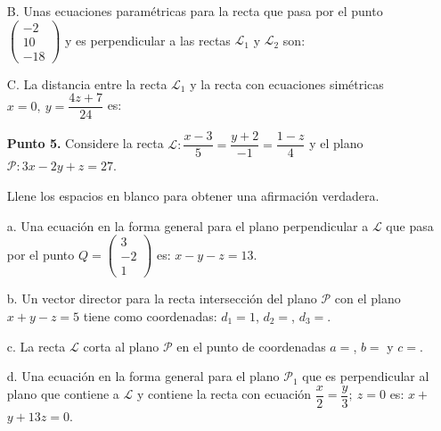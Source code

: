 \documentclass[11pt]{article}
\newcommand{\vectiii}[3]{\begin{pmatrix}#1\\#2\\#3\end{pmatrix}}
\begin{document}
\begin{enumerate}
B. Unas ecuaciones paramétricas para la recta que pasa por el punto $\vectiii{-2}{10}{-18}$ y es perpendicular a las rectas $\mathcal{L}_1$ y $\mathcal{L}_2$ son:

C. La distancia entre la recta $\mathcal{L}_1$ y la recta con ecuaciones simétricas $x=0,\ y=\dfrac{4z+7}{24}$ es:

\item[\textbf{Punto 5.}] Considere la recta $\mathcal{L}:\dfrac{x-3}{5}=\dfrac{y+2}{-1}=\dfrac{1-z}{4}$ y el plano $\mathcal{P}: 3x-2y+z=27$.

Llene los espacios en blanco para obtener una afirmación verdadera.

a. Una ecuación en la forma general para el plano perpendicular a $\mathcal{L}$ que pasa por el punto $Q=\vectiii{3}{-2}{1}$ es: \underline{\hspace{1cm}}$x-$\underline{\hspace{1cm}}$y-$\underline{\hspace{1cm}}$z=13$.

b. Un vector director para la recta intersección del plano $\mathcal{P}$ con el plano $x+y-z=5$ tiene como coordenadas: $d_1=1$, $d_2=$\underline{\hspace{1cm}}, $d_3=$\underline{\hspace{1cm}}.

c. La recta $\mathcal{L}$ corta al plano $\mathcal{P}$ en el punto de coordenadas $a=$\underline{\hspace{1cm}}, $b=$\underline{\hspace{1cm}} y $c=$\underline{\hspace{1cm}}.

d. Una ecuación en la forma general para el plano $\mathcal{P}_1$ que es perpendicular al plano que contiene a $\mathcal{L}$ y contiene la recta con ecuación $\dfrac{x}{2}=\dfrac{y}{3};\ z=0$ es: \underline{\hspace{1cm}}$x+$\underline{\hspace{1cm}}$y+13z=0$.


\end{enumerate}
\end{document}
